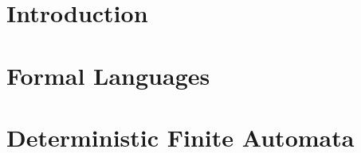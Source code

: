 \documentclass[11pt,oneside]{article}
\begin{document}
\tableofcontents


\section{Introduction}\label{intro}

\section{Formal Languages}\label{languages}

\section{Deterministic Finite Automata}\label{dfa}
\end{document}
